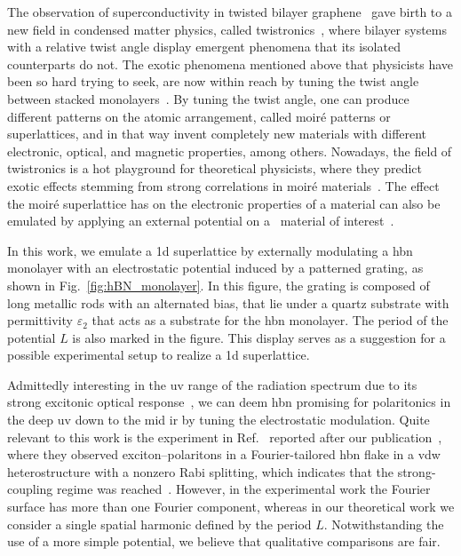 The observation of superconductivity in twisted bilayer graphene~\cite{Cao_2018} gave birth to a new field in condensed matter physics, called twistronics~\cite{Hennighausen_Kar_2021,Aggarwal_Narula_Ghosh_2023}, where bilayer systems with a relative twist angle display emergent phenomena that its isolated counterparts do not.
The exotic phenomena mentioned above that physicists have been so hard trying to seek, are now within reach by tuning the twist angle between stacked monolayers~\cite{Cao_2020,Zhang_2022,Du_Xiao_2024}.
By tuning the twist angle, one can produce different patterns on the atomic arrangement, called moir\'e patterns or superlattices, and in that way invent completely new materials with different electronic, optical, and magnetic properties, among others.
Nowadays, the field of twistronics is a hot playground for theoretical physicists, where they predict exotic effects stemming from strong correlations in moir\'e materials~\cite{Lopes_dos_2007,Xian_Rubio_2019,Song_Bernevig_2022}.
The effect the moir\'e superlattice has on the electronic properties of a material can also be emulated by applying an external potential on a \bd~material of interest~\cite{Fu_Pixley_2020,Lee_Pixley_2022}.

In this work, we emulate a \gls{1d} superlattice by externally modulating a \gls{hbn} monolayer with an electrostatic potential induced by a patterned grating, as shown in Fig.~\ref{fig:hBN_monolayer}.
In this figure, the grating is composed of long metallic rods with an alternated bias, that lie under a quartz substrate with permittivity $\varepsilon_2$ that acts as a substrate for the \gls{hbn} monolayer.
The period of the potential $L$ is also marked in the figure.
This display serves as a suggestion for a possible experimental setup to realize a \gls{1d} superlattice.

Admittedly interesting in the \gls{uv} range of the radiation spectrum due to its strong excitonic optical response~\cite{Ferreira_Chaves_Peres_Ribeiro_2019}, we can deem \gls{hbn} promising for polaritonics in the deep \gls{uv} down to the mid \gls{ir} by tuning the electrostatic modulation.
Quite relevant to this work is the experiment in Ref.~\cite{Danielsen_Lassaline_2025} reported after our publication~\cite{Ninhos_Tserkezis_Mortensen_Peres_2024}, where they observed exciton--polaritons in a Fourier-tailored \gls{hbn} flake in a \gls{vdw} heterostructure with a nonzero Rabi splitting, which indicates that the strong-coupling regime was reached~\cite{Danielsen_Lassaline_2025}.
However, in the experimental work the Fourier surface has more than one Fourier component, whereas in our theoretical work we consider a single spatial harmonic defined by the period $L$.
Notwithstanding the use of a more simple potential, we believe that qualitative comparisons are fair.

